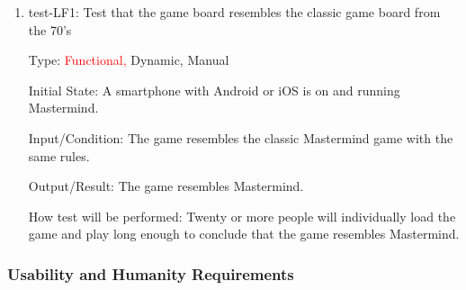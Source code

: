\documentclass[12pt, titlepage]{article}
\begin{document}
\begin{enumerate}

\item{test-LF1: Test that the game board resembles the classic game board from the 70's\\}

Type: \textcolor{red}{Functional, }Dynamic, Manual
					
Initial State: A smartphone with Android or iOS is on and running Mastermind.
					
Input/Condition: The game resembles the classic Mastermind game with the same rules.
					
Output/Result: The game resembles Mastermind.
					
How test will be performed: Twenty or more people will individually load the game and play long enough to conclude that the game resembles Mastermind.

\end{enumerate}

\subsubsection{Usability and Humanity Requirements}
\end{document}
